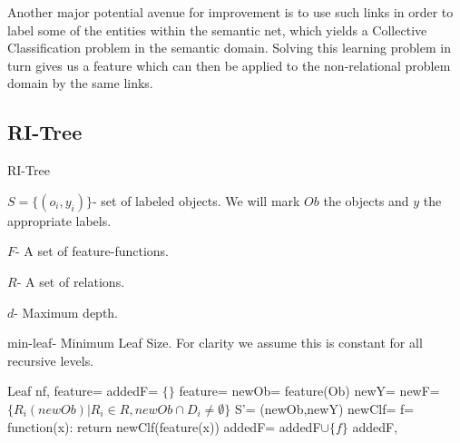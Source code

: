 \documentclass{article}
\theoremstyle{definition}
\begin{document}
Another major potential avenue for improvement is to use such links in order to label some of the entities within the semantic net, which yields a Collective Classification \citep{laorden2012collective, kajdanowicz2013collective} problem in the semantic domain. Solving this learning problem in turn gives us a feature which can then be applied to the non-relational problem domain by the same links.

\begin{appendices}
	\section{RI-Tree} \label{app:2}
	
	\begin{algorithm}[H]
		\caption{RI-Tree}
		\label{code2}
		\small
		$S=\{(o_{i},y_{i})\}$- set of labeled objects. We will mark $Ob$ the objects and $y$ the appropriate labels.
		
		$F$- A set of feature-functions.
		
		$R$- A set of relations.
		
		$d$- Maximum depth.
		
		min-leaf- Minimum Leaf Size. For clarity we assume this is constant for all recursive levels.
		
		\begin{algorithmic}
					\State
					\Return Leaf
				\EndIf
				\State nf, feature= 
				\State {}
				\State
				\Return {}
			\EndFunction
				\State
				\Return {}
			\EndIf
			\State addedF= $\{\}$
				\State feature= 
				\State newOb= feature(Ob)
				\State newY= 
				\State newF= $\{R_{i}(newOb)|R_{i}\in R, newOb\cap D_{i}\neq\emptyset\}$
				\State S'= (newOb,newY)
				\State newClf= 
				\State f= function(x): return newClf(feature(x))
					\State addedF= addedF$\cup \{f\}$
				\EndIf
			\EndWhile
			\State
			\Return addedF, 
			\EndFunction
			
		\end{algorithmic}
	\end{algorithm}
	
\end{appendices}

\clearpage


\end{document}
